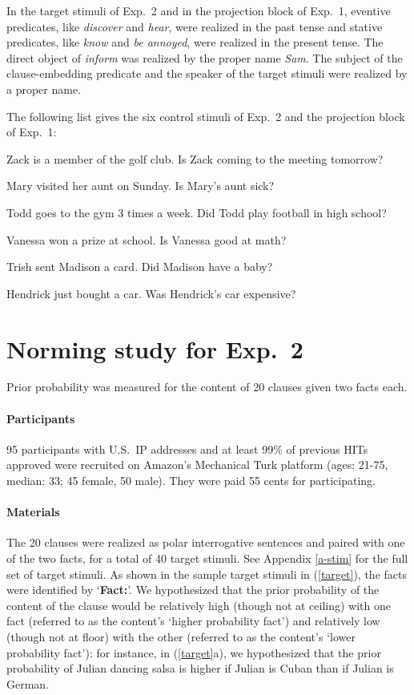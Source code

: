 \documentclass[11pt,fleqn]{article}
\newcommand{\6}{\mbox{$[\hspace*{-.6mm}[$}}
\newcommand{\9}{\mbox{$]\hspace*{-.6mm}]$}}
\begin{document}
In the target stimuli of Exp.~2 and in the projection block of Exp.~1, eventive predicates, like {\em discover} and {\em hear}, were realized in the past tense and stative predicates, like {\em know} and {\em be annoyed}, were realized in the present tense. The direct object of {\em inform} was realized by the proper name {\em Sam}. The subject of the clause-embedding predicate and the speaker of the target stimuli were realized by a proper name. 

\bigskip
\noindent
The following list gives the six control stimuli of Exp.~2 and the projection block of Exp.~1: 

\begin{enumerate}[leftmargin=3ex,itemsep=-2pt]
  Zack is a member of the golf club. Is Zack coming to the meeting tomorrow?

 Mary visited her aunt on Sunday. Is Mary's aunt sick?

 Todd goes to the gym 3 times a week. Did Todd play football in high school?

 Vanessa won a prize at school. Is Vanessa good at math?

 Trish sent Madison a card. Did Madison have a baby?

 Hendrick just bought a car. Was Hendrick's car expensive?
\end{enumerate}

\section{Norming study for Exp.~2}\label{a-norming}

Prior probability was measured for the content of 20 clauses given two facts each.

\paragraph{Participants} 95 participants with U.S.\ IP addresses and at least 99\% of previous HITs approved were recruited on Amazon's Mechanical Turk platform (ages: 21-75, median: 33; 45 female, 50 male). They were paid 55 cents for participating.

\paragraph{Materials} The 20 clauses were realized as polar interrogative sentences and paired with one of the two facts, for a total of 40 target stimuli. See Appendix \ref{a-stim} for the full set of target stimuli. As shown in the sample target stimuli in (\ref{target}), the facts were identified by `{\bf Fact:}'. We hypothesized that the prior probability of the content of the clause would be relatively high (though not at ceiling) with one fact (referred to as the content's `higher probability fact') and relatively low (though not at floor) with the other (referred to as the content's `lower probability fact'): for instance, in (\ref{target}a), we hypothesized that the prior probability of Julian dancing salsa is higher if Julian is Cuban than if Julian is German.
\end{document}
